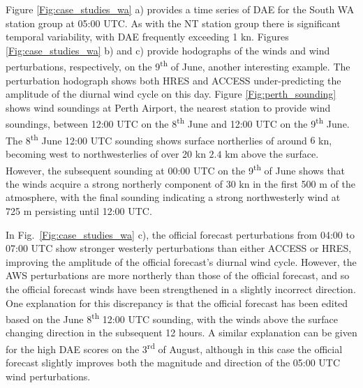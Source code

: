 \documentclass[twocol]{ametsoc}
\begin{document}
Figure \ref{Fig:case_studies_wa} a) provides a time series of DAE for the South WA station group at 05:00 UTC. As with the NT station group there is significant temporal variability, with DAE frequently exceeding 1 kn. Figures \ref{Fig:case_studies_wa} b) and c) provide hodographs of the winds and wind perturbations, respectively, on the 9\textsuperscript{th} of June, another interesting example. The perturbation hodograph shows both HRES and ACCESS under-predicting the amplitude of the diurnal wind cycle on this day. Figure \ref{Fig:perth_sounding} shows wind soundings at Perth Airport, the nearest station to provide wind soundings, between 12:00 UTC on the 8\textsuperscript{th} June and 12:00 UTC on the 9\textsuperscript{th} June. The 8\textsuperscript{th} June 12:00 UTC sounding shows surface northerlies of around $6$ kn, becoming west to northwesterlies of over 20 kn $2.4$ km above the surface. However, the subsequent sounding at 00:00 UTC on the 9\textsuperscript{th} of June shows that the winds acquire a strong northerly component of 30 kn in the first 500 m of the atmosphere, with the final sounding indicating a strong northwesterly wind at 725 m persisting until 12:00 UTC. 

In Fig.~\ref{Fig:case_studies_wa} c), the official forecast perturbations from 04:00 to 07:00 UTC show stronger westerly perturbations than either ACCESS or HRES, improving the amplitude of the official forecast's diurnal wind cycle. However, the AWS perturbations are more northerly than those of the official forecast, and so the official forecast winds have been strengthened in a slightly incorrect direction. One explanation for this discrepancy is that the official forecast has been edited based on the June 8\textsuperscript{th} 12:00 UTC sounding, with the winds above the surface changing direction in the subsequent 12 hours. A similar explanation can be given for the high DAE scores on the  3\textsuperscript{rd} of August, although in this case the official forecast slightly improves both the magnitude and direction of the 05:00 UTC wind perturbations.
\end{document}
